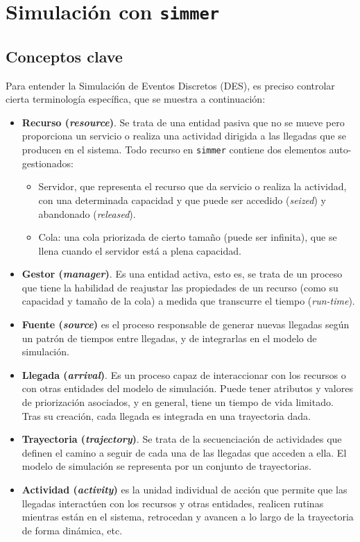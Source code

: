 \documentclass[
]{book}
\providecommand{\tightlist}{%
  \setlength{\itemsep}{0pt}\setlength{\parskip}{0pt}}
\theoremstyle{definition}
\theoremstyle{definition}
\theoremstyle{definition}
\theoremstyle{definition}
\theoremstyle{remark}
\begin{document}
\hypertarget{simulaciuxf3n-con-simmer-1}{%
\section{\texorpdfstring{Simulación con \texttt{simmer}}{Simulación con simmer}}\label{simulaciuxf3n-con-simmer-1}}

\hypertarget{conceptos-clave}{%
\subsection{Conceptos clave}\label{conceptos-clave}}

Para entender la Simulación de Eventos Discretos (DES), es preciso controlar cierta terminología específica, que se muestra a continuación:

\begin{itemize}
\item
  \textbf{Recurso (\emph{resource})}. Se trata de una entidad pasiva que no se mueve pero proporciona un servicio o realiza una actividad dirigida a las llegadas que se producen en el sistema. Todo recurso en \texttt{simmer} contiene dos elementos auto-gestionados:

  \begin{itemize}
  \tightlist
  \item
    Servidor, que representa el recurso que da servicio o realiza la actividad, con una determinada capacidad y que puede ser accedido (\emph{seized}) y abandonado (\emph{released}).
  \item
    Cola: una cola priorizada de cierto tamaño (puede ser infinita), que se llena cuando el servidor está a plena capacidad.
  \end{itemize}
\item
  \textbf{Gestor (\emph{manager})}. Es una entidad activa, esto es, se trata de un proceso que tiene la habilidad de reajustar las propiedades de un recurso (como su capacidad y tamaño de la cola) a medida que transcurre el tiempo (\emph{run-time}).
\item
  \textbf{Fuente (\emph{source})} es el proceso responsable de generar nuevas llegadas según un patrón de tiempos entre llegadas, y de integrarlas en el modelo de simulación.
\item
  \textbf{Llegada (\emph{arrival})}. Es un proceso capaz de interaccionar con los recursos o con otras entidades del modelo de simulación. Puede tener atributos y valores de priorización asociados, y en general, tiene un tiempo de vida limitado. Tras su creación, cada llegada es integrada en una trayectoria dada.
\item
  \textbf{Trayectoria (\emph{trajectory})}. Se trata de la secuenciación de actividades que definen el camino a seguir de cada una de las llegadas que acceden a ella. El modelo de simulación se representa por un conjunto de trayectorias.
\item
  \textbf{Actividad (\emph{activity})} es la unidad individual de acción que permite que las llegadas interactúen con los recursos y otras entidades, realicen rutinas mientras están en el sistema, retrocedan y avancen a lo largo de la trayectoria de forma dinámica, etc.
\end{itemize}
\end{document}
